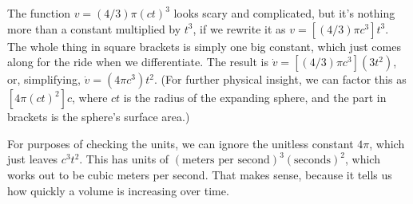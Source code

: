 The function $v=(4/3)\pi(ct)^3$ looks scary and complicated, but it's nothing more than a constant
multiplied by $t^3$, if we rewrite it as $v=\left[(4/3)\pi c^3\right]t^3$. The whole thing
in square brackets is simply one big constant, which just comes along for the ride
when we differentiate. The result is $\dot{v}=\left[(4/3)\pi c^3\right](3t^2)$, or,
simplifying, $\dot{v}=\left(4\pi c^3\right)t^2$. (For further physical insight, we can
factor this as $\left[4\pi (ct)^2\right]c$, where $ct$ is the radius of the expanding sphere, and
the part in brackets is the sphere's surface area.)

For purposes of checking the units, we can ignore the unitless constant $4\pi$, which just
leaves $c^3t^2$. This has units of $(\text{meters per second})^3(\text{seconds})^2$, which
works out to be cubic meters per second. That makes sense, because it tells us how quickly
a volume is increasing over time.
